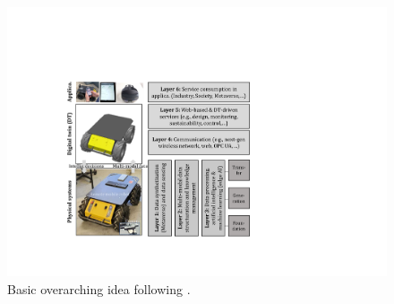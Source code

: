 \documentclass[conference]{IEEEtran}
\begin{document}
\begin{figure}[htbp]
    \centerline{\includegraphics[width=0.98\columnwidth]{Pictures/layer0.pdf}}
    \caption{Basic overarching idea following \cite{kaigom,kaigom2020value}.}
    \label{fig:3dreal}
\end{figure}
\end{document}
